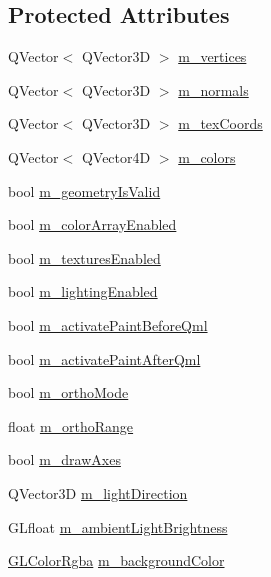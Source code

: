\subsection*{Protected Attributes}
\begin{DoxyCompactItemize}
\item 
Q\+Vector$<$ Q\+Vector3D $>$ \mbox{\hyperlink{class_g_l_item_acf6802c6d50a16ff8fbb0b0b1413dcc8}{m\+\_\+vertices}}
\item 
Q\+Vector$<$ Q\+Vector3D $>$ \mbox{\hyperlink{class_g_l_item_ab36af5032ab015c92a55fbed02c40c4d}{m\+\_\+normals}}
\item 
Q\+Vector$<$ Q\+Vector3D $>$ \mbox{\hyperlink{class_g_l_item_a4b1e91a116668252bb1c099ddb2ccc3a}{m\+\_\+tex\+Coords}}
\item 
Q\+Vector$<$ Q\+Vector4D $>$ \mbox{\hyperlink{class_g_l_item_aeb7650aa679d0b95cc3bb99e9bf220fc}{m\+\_\+colors}}
\item 
bool \mbox{\hyperlink{class_g_l_item_ac9a158bb5880321e7777a64fdc4c69a9}{m\+\_\+geometry\+Is\+Valid}}
\item 
bool \mbox{\hyperlink{class_g_l_item_a57b8c3fa334a8322c4d040532eb51aef}{m\+\_\+color\+Array\+Enabled}}
\item 
bool \mbox{\hyperlink{class_g_l_item_a75f48d9e816ab64f6f2e4025c690b9b8}{m\+\_\+textures\+Enabled}}
\item 
bool \mbox{\hyperlink{class_g_l_item_ad8770dd7051138df6a0da7b412254e34}{m\+\_\+lighting\+Enabled}}
\item 
bool \mbox{\hyperlink{class_g_l_item_a6034466c7a88892138e14294876144b7}{m\+\_\+activate\+Paint\+Before\+Qml}}
\item 
bool \mbox{\hyperlink{class_g_l_item_a077f0ece18caae8fa8a16ba36c51cac9}{m\+\_\+activate\+Paint\+After\+Qml}}
\item 
bool \mbox{\hyperlink{class_g_l_item_a7ff6af05a375bac0cc2cc9333595de43}{m\+\_\+ortho\+Mode}}
\item 
float \mbox{\hyperlink{class_g_l_item_a9829d649c448ca4a92b5ccac08d51d68}{m\+\_\+ortho\+Range}}
\item 
bool \mbox{\hyperlink{class_g_l_item_ac323dad2cc4683da8925b461856603d3}{m\+\_\+draw\+Axes}}
\item 
Q\+Vector3D \mbox{\hyperlink{class_g_l_item_a1d3d64533872bf01a9d472554c371871}{m\+\_\+light\+Direction}}
\item 
G\+Lfloat \mbox{\hyperlink{class_g_l_item_a81f1697f1783f043c424fca09eb5a2a5}{m\+\_\+ambient\+Light\+Brightness}}
\item 
\mbox{\hyperlink{class_g_l_color_rgba}{G\+L\+Color\+Rgba}} \mbox{\hyperlink{class_g_l_item_a54d5d7350de34add6a0f4616b2d9d3c7}{m\+\_\+background\+Color}}

\end{DoxyCompactItemize}
